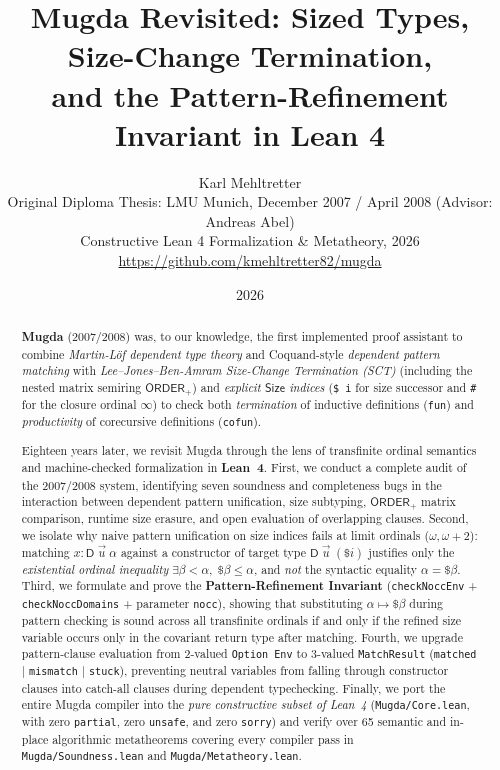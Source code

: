 \documentclass[11pt,a4paper]{article}
\title{\textbf{Mugda Revisited: Sized Types, Size-Change Termination,\\and the Pattern-Refinement Invariant in Lean 4}}
\author{Karl Mehltretter\\
\small Original Diploma Thesis: LMU Munich, December 2007 / April 2008 (Advisor: Andreas Abel)\\
\small Constructive Lean 4 Formalization \& Metatheory, 2026\\
\small \url{https://github.com/kmehltretter82/mugda}}
\date{2026}
\begin{document}
\maketitle

\begin{abstract}
\textbf{Mugda} (2007/2008) was, to our knowledge, the first implemented proof assistant to combine
\emph{Martin-L\"of dependent type theory} and Coquand-style \emph{dependent pattern matching} with
\emph{Lee--Jones--Ben-Amram Size-Change Termination (SCT)} (including the nested matrix semiring $\mathsf{ORDER}_+$)
and \emph{explicit $\mathsf{Size}$ indices} (\texttt{\$ i} for size successor and \texttt{\#} for the closure ordinal $\infty$)
to check both \emph{termination} of inductive definitions (\texttt{fun}) and \emph{productivity} of corecursive definitions (\texttt{cofun}).

Eighteen years later, we revisit Mugda through the lens of transfinite ordinal semantics and machine-checked formalization in \textbf{Lean~4}.
First, we conduct a complete audit of the 2007/2008 system, identifying seven soundness and completeness bugs in the interaction between dependent pattern unification, size subtyping, $\mathsf{ORDER}_+$ matrix comparison, runtime size erasure, and open evaluation of overlapping clauses.
Second, we isolate why naive pattern unification on size indices fails at limit ordinals ($\omega, \omega + 2$): matching $x : \mathsf{D}\;\vec{u}\;\alpha$ against a constructor of target type $\mathsf{D}\;\vec{u}\;(\$ i)$ justifies only the \emph{existential ordinal inequality} $\exists \beta < \alpha,\; \$ \beta \le \alpha$, and \emph{not} the syntactic equality $\alpha = \$ \beta$.
Third, we formulate and prove the \textbf{Pattern-Refinement Invariant} (\texttt{checkNoccEnv} + \texttt{checkNoccDomains} + parameter \texttt{nocc}), showing that substituting $\alpha \mapsto \$ \beta$ during pattern checking is sound across all transfinite ordinals if and only if the refined size variable occurs only in the covariant return type after matching.
Fourth, we upgrade pattern-clause evaluation from 2-valued \texttt{Option Env} to 3-valued \texttt{MatchResult} (\texttt{matched} $\mid$ \texttt{mismatch} $\mid$ \texttt{stuck}), preventing neutral variables from falling through constructor clauses into catch-all clauses during dependent typechecking.
Finally, we port the entire Mugda compiler into the \emph{pure constructive subset of Lean~4} (\texttt{Mugda/Core.lean}, with zero \texttt{partial}, zero \texttt{unsafe}, and zero \texttt{sorry}) and verify over 65 semantic and in-place algorithmic metatheorems covering every compiler pass in \texttt{Mugda/Soundness.lean} and \texttt{Mugda/Metatheory.lean}.
\end{abstract}
\end{document}
